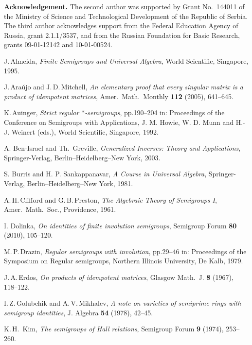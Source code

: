 \documentclass[11pt,reqno]{amsart}
\numberwithin{equation}{section}
\theoremstyle{remark}
\begin{document}
\noindent\textbf{Acknowledgement.} The second author was supported
by Grant No.\ 144011 of the Ministry of Science and Technological
Development of the Republic of Serbia. The third author
acknowledges support from the Federal Education Agency of Russia,
grant 2.1.1/3537, and from the Russian Foundation for Basic
Research, grants 09-01-12142 and 10-01-00524.

\begin{thebibliography}{99}

J.\,Almeida, \emph{Finite Semigroups and Universal Algebra}, World
Scientific, Singapore, 1995.

J.\,Ara\'ujo and J.\,D.\,Mitchell, \emph{An elementary proof that
every singular matrix is a product of idempotent matrices}, Amer.\
Math.\ Monthly \textbf{112} (2005), 641--645.

K.\,Auinger, \emph{Strict regular $*$-semigroups}, pp.190--204 in:
Proceedings of the Conference on Semigroups with Applications, J.
M. Howie, W. D. Munn and H.-J. Weinert (eds.), World Scientific,
Singapore, 1992.

A. Ben-Israel and Th.\ Greville, \emph{Generalized Inverses:
Theory and Applications}, Springer-Verlag, Berlin--Heidelberg--New
York, 2003.

S. Burris and H. P. Sankappanavar, \emph{A Course in Universal
Algebra}, Springer-Verlag, Berlin--Heidelberg--New York, 1981.

A.\,H.\,Clifford and G.\,B.\,Preston, \emph{The Algebraic Theory
of Semigroups I}, Amer.\ Math.\ Soc., Providence, 1961.

I. Dolinka, \emph{On identities of finite involution semigroups},
Semigroup Forum \textbf{80} (2010), 105--120.

M.\,P.\,Drazin, \emph{Regular semigroups with involution},
pp.29--46 in: Proceedings of the Symposium on Regular semigroups,
Northern Illinois University, De Kalb, 1979.

J.\,A.\,Erdos, \emph{On products of idempotent matrices}, Glasgow
Math.\ J. \textbf{8} (1967), 118--122.

I.\,Z.\,Golubchik and A.\,V.\,Mikhalev, \emph{A note on varieties
of semiprime rings with semigroup identities}, J. Algebra
\textbf{54} (1978), 42--45.

K.\,H.\, Kim, \emph{The semigroups of Hall relations}, Semigroup Forum
\textbf{9} (1974), 253--260.


\end{thebibliography}
\end{document}
